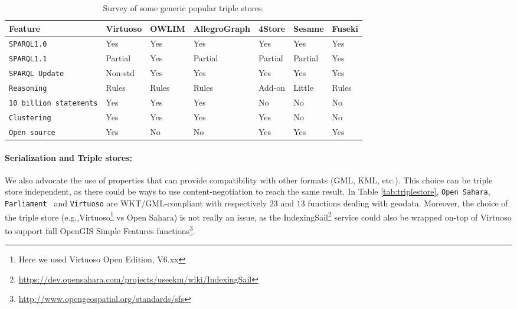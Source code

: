 \begin{table}[htb!]
    \caption{Survey of some generic popular triple stores.}
    \label{tab:generictriples}
    \centering
    \begin{tabular}{lllllll}
    \toprule
    \textbf{Feature} & \textbf{Virtuoso} & \textbf{OWLIM} & \textbf{AllegroGraph} & \textbf{4Store} &  \textbf{Sesame} & \textbf{Fuseki} \\
    \toprule
    \texttt{SPARQL1.0} & Yes & Yes & Yes & Yes & Yes & Yes \\
    \midrule
    \texttt{SPARQL1.1} & Partial & Yes & Partial & Partial & Partial & Yes \\
    \midrule
    \texttt{SPARQL Update} & Non-std & Yes & Yes & Yes & Yes & Yes \\
    \midrule
    \texttt{Reasoning} & Rules & Rules & Rules & Add-on & Little & Rules \\
    \midrule
    \texttt{10 billion statements} & Yes & Yes & Yes & No & No & No \\
    \midrule
    \texttt{Clustering} & Yes & Yes & Yes & Yes & No & No \\
    \midrule
    \texttt{Open source} & Yes & No & No & Yes & Yes & Yes \\
    \bottomrule
    \end{tabular}
\end{table}

\paragraph{Serialization and Triple stores:} We also advocate the use of properties that can provide compatibility with other formats (GML, KML, etc.). This choice can be triple store independent, as there could be ways to use content-negotiation to reach the same result. In Table \ref{tab:triplestore}, \texttt{Open Sahara}, \texttt{Parliament } and  \texttt{Virtuoso} are WKT/GML-compliant with respectively $23$ and $13$ functions dealing with geodata. Moreover, the choice of the triple store (e.g.,Virtuoso\footnote{Here we used Virtuoso Open Edition, V6.xx} vs Open Sahara) is not really an issue, as the IndexingSail\footnote{\url{https://dev.opensahara.com/projects/useekm/wiki/IndexingSail}} service could also be wrapped on-top of Virtuoso to support full OpenGIS Simple Features functions\footnote{\url{http://www.opengeospatial.org/standards/sfs}}.

